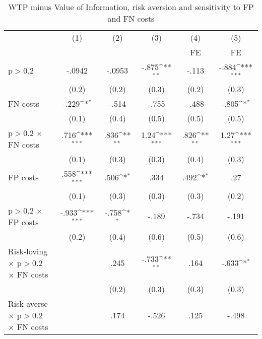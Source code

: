 \begin{table}[htbp]\centering
\def\sym#1{\ifmmode^{#1}\else\(^{#1}\)\fi}
\caption{WTP minus Value of Information, risk aversion and sensitivity to FP and FN costs}
\begin{tabular}{l*{5}{c}}
\hline\hline
                &\multicolumn{1}{c}{(1)}&\multicolumn{1}{c}{(2)}&\multicolumn{1}{c}{(3)}&\multicolumn{1}{c}{(4)}&\multicolumn{1}{c}{(5)}\\
                &\multicolumn{1}{c}{}&\multicolumn{1}{c}{}&\multicolumn{1}{c}{}&\multicolumn{1}{c}{FE}&\multicolumn{1}{c}{FE}\\
\hline
p$>$0.2         &   -.0942         &   -.0953         &    -.875\sym{**} &    -.113         &    -.884\sym{***}\\
                &    (0.2)         &    (0.2)         &    (0.3)         &    (0.2)         &    (0.3)         \\
FN costs        &    -.229\sym{*}  &    -.514         &    -.755         &    -.488         &    -.805\sym{*}  \\
                &    (0.1)         &    (0.4)         &    (0.5)         &    (0.5)         &    (0.5)         \\
p$>$0.2 $\times$ FN costs&     .716\sym{***}&     .836\sym{**} &     1.24\sym{***}&     .826\sym{**} &     1.27\sym{***}\\
                &    (0.1)         &    (0.3)         &    (0.3)         &    (0.4)         &    (0.3)         \\
FP costs        &     .558\sym{***}&     .506\sym{*}  &     .334         &     .492\sym{*}  &      .27         \\
                &    (0.1)         &    (0.3)         &    (0.3)         &    (0.3)         &    (0.2)         \\
p$>$0.2 $\times$ FP costs&    -.933\sym{***}&    -.758\sym{*}  &    -.189         &    -.734         &    -.191         \\
                &    (0.2)         &    (0.4)         &    (0.6)         &    (0.5)         &    (0.6)         \\
Risk-loving $\times$ p$>$0.2 $\times$ FN costs&                  &     .245         &    -.733\sym{**} &     .164         &    -.633\sym{*}  \\
                &                  &    (0.2)         &    (0.3)         &    (0.3)         &    (0.3)         \\
Risk-averse $\times$ p$>$0.2 $\times$ FN costs&                  &     .174         &    -.526         &     .125         &    -.498         \\

\end{tabular}
\end{table}
